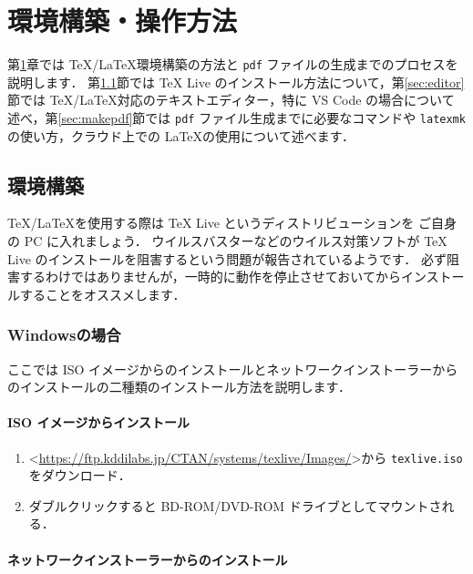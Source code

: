 \chapter{環境構築・操作方法}
\label{ch:howtouse}

第\ref{ch:howtouse}章では \TeX/\LaTeX 環境構築の方法と \verb|pdf| ファイルの生成までのプロセスを説明します．
第\ref{sec:environment}節では TeX Live のインストール方法について，第\ref{sec:editor}節では \TeX/\LaTeX 対応のテキストエディター，特に VS Code の場合について述べ，第\ref{sec:makepdf}節では \verb|pdf| ファイル生成までに必要なコマンドや \verb|latexmk| の使い方，クラウド上での \LaTeX の使用について述べます．

\section{環境構築}
\label{sec:environment}

\TeX/\LaTeX を使用する際は TeX Live というディストリビューションを ご自身の PC に入れましょう．
ウイルスバスターなどのウイルス対策ソフトが TeX Live のインストールを阻害するという問題が報告されているようです．
必ず阻害するわけではありませんが，一時的に動作を停止させておいてからインストールすることをオススメします．


\subsection{Windowsの場合}
\label{ssec:windows}

ここでは ISO イメージからのインストールとネットワークインストーラーからのインストールの二種類のインストール方法を説明します．

\subsubsection*{ISO イメージからインストール}

\begin{enumerate}
    \item \textless\url{https://ftp.kddilabs.jp/CTAN/systems/texlive/Images/}\textgreater から \verb|texlive.iso| をダウンロード．
    \item ダブルクリックすると BD-ROM/DVD-ROM ドライブとしてマウントされる．
\end{enumerate}


\subsubsection*{ネットワークインストーラーからのインストール}


